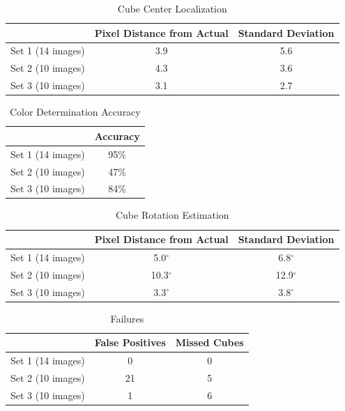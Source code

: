 \documentclass[conference]{IEEEtran}
\begin{document}
\begin{table}[!t]
\renewcommand{\arraystretch}{1.3}
\caption{Cube Center Localization}
\label{table_1}
\centering
\begin{tabular}{|c|c|c|}
\hline
 & Pixel Distance from Actual &  Standard Deviation\\
\hline
Set 1 (14 images) & 3.9 & 5.6\\
\hline
Set 2 (10 images) & 4.3 & 3.6\\
\hline
Set 3 (10 images) & 3.1 & 2.7\\
\hline
\end{tabular}
\end{table}

\begin{table}[!t]
\renewcommand{\arraystretch}{1.3}
\caption{Color Determination Accuracy}
\label{table_2}
\centering
\begin{tabular}{|c|c|}
\hline
 & Accuracy\\
\hline
Set 1 (14 images) & 95\% \\
\hline
Set 2 (10 images) & 47\% \\
\hline
Set 3 (10 images) & 84\% \\
\hline
\end{tabular}
\end{table}

\begin{table}[!t]
\renewcommand{\arraystretch}{1.3}
\caption{Cube Rotation Estimation}
\label{table_3}
\centering
\begin{tabular}{|c|c|c|}
\hline
 & Pixel Distance from Actual &  Standard Deviation\\
\hline
Set 1 (14 images) & 5.0$^{\circ}$ & 6.8$^{\circ}$\\
\hline
Set 2 (10 images) & 10.3$^{\circ}$ & 12.9$^{\circ}$\\
\hline
Set 3 (10 images) & 3.3$^{\circ}$ & 3.8$^{\circ}$\\
\hline
\end{tabular}
\end{table}

\begin{table}[!t]
\renewcommand{\arraystretch}{1.3}
\caption{Failures}
\label{table_4}
\centering
\begin{tabular}{|c|c|c|}
\hline
 & False Positives & Missed Cubes\\
\hline
Set 1 (14 images) & 0 & 0 \\
\hline
Set 2 (10 images) & 21 & 5\\
\hline
Set 3 (10 images) & 1 & 6 \\
\hline
\end{tabular}
\end{table}
\end{document}
